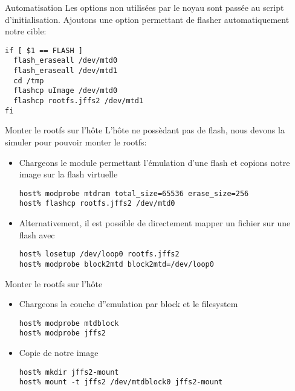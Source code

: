 \begin{frame}[fragile=singleslide]{Automatisation}
  Les  options  non utilisées  par  le  noyau  sont passée  au  script
  d'initialisation.   Ajoutons  une   option  permettant   de  flasher
  automatiquement notre cible:
  \begin{lstlisting}
if [ $1 == FLASH ]
  flash_eraseall /dev/mtd0
  flash_eraseall /dev/mtd1
  cd /tmp
  flashcp uImage /dev/mtd0
  flashcp rootfs.jffs2 /dev/mtd1
fi
  \end{lstlisting}
\end{frame}

\begin{frame}[fragile=singleslide]{Monter le rootfs sur l'hôte}
  L'hôte  ne possèdant  pas  de  flash, nous  devons  la simuler  pour
  pouvoir monter le rootfs:
  \begin{itemize} 
  \item  Chargeons le  module  permettant l'émulation  d'une flash  et
    copions notre image sur la flash virtuelle
    \begin{lstlisting}
host% modprobe mtdram total_size=65536 erase_size=256
host% flashcp rootfs.jffs2 /dev/mtd0
    \end{lstlisting}
  \item  Alternativement, il  est  possible de  directement mapper  un
    fichier sur une flash avec 
    \begin{lstlisting}
host% losetup /dev/loop0 rootfs.jffs2
host% modprobe block2mtd block2mtd=/dev/loop0
    \end{lstlisting} 
  \end{itemize}
\end{frame}

\begin{frame}[fragile=singleslide]{Monter le rootfs sur l'hôte}
  \begin{itemize} 
  \item Chargeons la couche d''emulation par block et le filesystem
    \begin{lstlisting}
host% modprobe mtdblock
host% modprobe jffs2
    \end{lstlisting}
  \item Copie de notre image
    \begin{lstlisting} 
host% mkdir jffs2-mount
host% mount -t jffs2 /dev/mtdblock0 jffs2-mount
    \end{lstlisting} 
  \end{itemize}
\end{frame}

